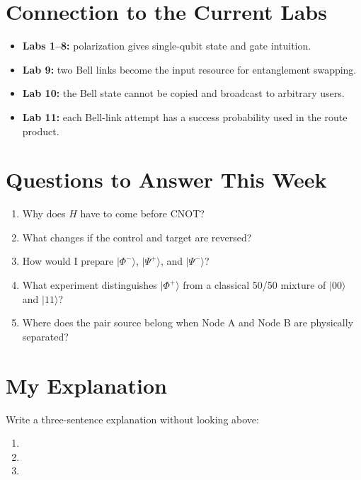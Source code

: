 \documentclass[11pt]{article}
\begin{document}
\section{Connection to the Current Labs}

\begin{itemize}
    \item \textbf{Labs 1--8:} polarization gives single-qubit state and gate intuition.
    \item \textbf{Lab 9:} two Bell links become the input resource for entanglement swapping.
    \item \textbf{Lab 10:} the Bell state cannot be copied and broadcast to arbitrary users.
    \item \textbf{Lab 11:} each Bell-link attempt has a success probability used in the route product.
\end{itemize}

\section{Questions to Answer This Week}

\begin{enumerate}
    \item Why does \(H\) have to come before CNOT?
    \item What changes if the control and target are reversed?
    \item How would I prepare \( |\Phi^-\rangle \), \( |\Psi^+\rangle \), and \( |\Psi^-\rangle \)?
    \item What experiment distinguishes \( |\Phi^+\rangle \) from a classical 50/50 mixture of \( |00\rangle \) and \( |11\rangle \)?
    \item Where does the pair source belong when Node A and Node B are physically separated?
\end{enumerate}

\section{My Explanation}

Write a three-sentence explanation without looking above:

\begin{enumerate}
    \item \vspace{1cm}
    \item \vspace{1cm}
    \item \vspace{1cm}
\end{enumerate}
\end{document}
